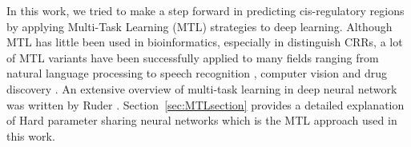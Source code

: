 In this work, we tried to make a step forward in predicting cis-regulatory
regions by applying Multi-Task Learning
(MTL) strategies to deep learning. Although MTL has little been used in bioinformatics,
especially in distinguish CRRs, a lot of MTL variants have been successfully applied to many
fields ranging from natural language processing \cite{CollobertWeston2008} to speech recognition \cite{Deng2013}, computer vision \cite{Girshick2015} and drug discovery \cite{Ramsundar2015}. An extensive overview of multi-task learning in deep neural network was written by Ruder \cite{Ruder2017}. Section~\ref{sec:MTLsection} provides a detailed explanation of Hard parameter sharing neural networks which is the MTL approach used in this work.